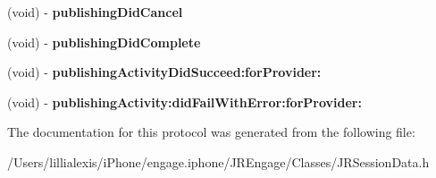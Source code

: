 \begin{DoxyCompactItemize}
\item 
\hypertarget{protocol_j_r_session_delegate-p_a60d88411ccff6c1576a2b491fddd4030}{
(void) -\/ {\bfseries publishingDidCancel}}
\label{protocol_j_r_session_delegate-p_a60d88411ccff6c1576a2b491fddd4030}

\item 
\hypertarget{protocol_j_r_session_delegate-p_ac1b170b67ee3581a3688f2f1d8d23dad}{
(void) -\/ {\bfseries publishingDidComplete}}
\label{protocol_j_r_session_delegate-p_ac1b170b67ee3581a3688f2f1d8d23dad}

\item 
\hypertarget{protocol_j_r_session_delegate-p_a5f4674f8d21433670c8c76749eef9391}{
(void) -\/ {\bfseries publishingActivityDidSucceed:forProvider:}}
\label{protocol_j_r_session_delegate-p_a5f4674f8d21433670c8c76749eef9391}

\item 
\hypertarget{protocol_j_r_session_delegate-p_a5f1f5ae16d8b44dae13336d565eedfd1}{
(void) -\/ {\bfseries publishingActivity:didFailWithError:forProvider:}}
\label{protocol_j_r_session_delegate-p_a5f1f5ae16d8b44dae13336d565eedfd1}

\end{DoxyCompactItemize}


The documentation for this protocol was generated from the following file:\begin{DoxyCompactItemize}
\item 
/Users/lillialexis/iPhone/engage.iphone/JREngage/Classes/JRSessionData.h\end{DoxyCompactItemize}
